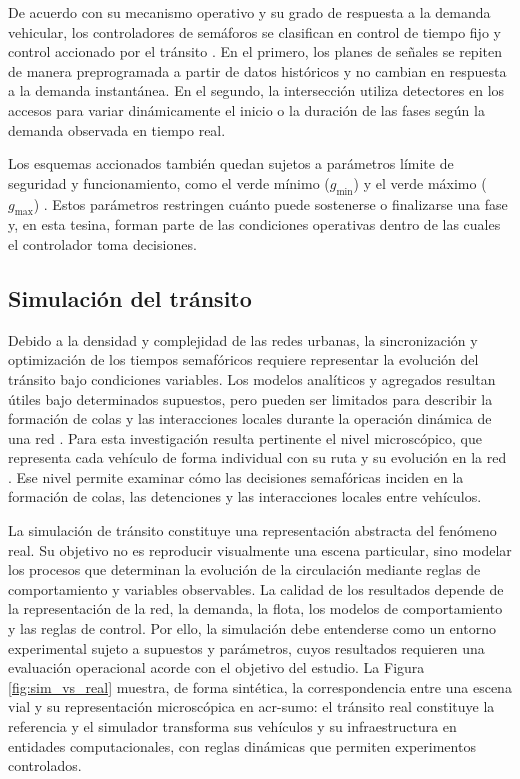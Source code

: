 De acuerdo con su mecanismo operativo y su grado de respuesta a la demanda vehicular, los controladores de semáforos se clasifican en control de tiempo fijo y control accionado por el tránsito \cite{ite_handbook}. En el primero, los planes de señales se repiten de manera preprogramada a partir de datos históricos y no cambian en respuesta a la demanda instantánea. En el segundo, la intersección utiliza detectores en los accesos para variar dinámicamente el inicio o la duración de las fases según la demanda observada en tiempo real.

Los esquemas accionados también quedan sujetos a parámetros límite de seguridad y funcionamiento, como el verde mínimo ($g_{\min}$) y el verde máximo ($g_{\max}$) \cite{ite_handbook}. Estos parámetros restringen cuánto puede sostenerse o finalizarse una fase y, en esta tesina, forman parte de las condiciones operativas dentro de las cuales el controlador toma decisiones.

\subsection{Simulación del tránsito}

Debido a la densidad y complejidad de las redes urbanas, la sincronización y optimización de los tiempos semafóricos requiere representar la evolución del tránsito bajo condiciones variables. Los modelos analíticos y agregados resultan útiles bajo determinados supuestos, pero pueden ser limitados para describir la formación de colas y las interacciones locales durante la operación dinámica de una red \cite{ite_handbook}. Para esta investigación resulta pertinente el nivel microscópico, que representa cada vehículo de forma individual con su ruta y su evolución en la red \cite{fernandez}. Ese nivel permite examinar cómo las decisiones semafóricas inciden en la formación de colas, las detenciones y las interacciones locales entre vehículos.

La simulación de tránsito constituye una representación abstracta del fenómeno real. Su objetivo no es reproducir visualmente una escena particular, sino modelar los procesos que determinan la evolución de la circulación mediante reglas de comportamiento y variables observables. La calidad de los resultados depende de la representación de la red, la demanda, la flota, los modelos de comportamiento y las reglas de control. Por ello, la simulación debe entenderse como un entorno experimental sujeto a supuestos y parámetros, cuyos resultados requieren una evaluación operacional acorde con el objetivo del estudio. La Figura \ref{fig:sim_vs_real} muestra, de forma sintética, la correspondencia entre una escena vial y su representación microscópica en \acrshort{acr-sumo}: el tránsito real constituye la referencia y el simulador transforma sus vehículos y su infraestructura en entidades computacionales, con reglas dinámicas que permiten experimentos controlados.

